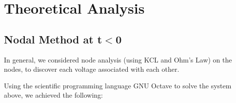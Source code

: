 \section{Theoretical Analysis} \label{sec:analysis}

\subsection{Nodal Method at t$<$0}

In general, we considered node analysis (using KCL and Ohm's Law) on the nodes, to discover each voltage associated with each other.

Using the scientific programming language GNU Octave to solve the system above, we achieved the following:






